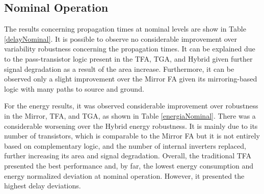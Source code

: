 \documentclass[pgmicro,mestrado,english]{iiufrgs}
\begin{document}
\subsection{Nominal Operation}

The results concerning propagation times at nominal levels are show in Table \ref{delayNominal}. It is possible to observe no considerable improvement over variability robustness concerning the propagation times. It can be explained due to the pass-transistor logic present in the TFA, TGA, and Hybrid given further signal degradation as a result of the area increase. Furthermore, it can be observed only a slight improvement over the Mirror FA given its mirroring-based logic with many paths to source and ground.

For the energy results, it was observed considerable improvement over robustness in the Mirror, TFA, and TGA, as shown in Table \ref{energiaNominal}. There was a considerable worsening over the Hybrid energy robustness. It is mainly due to its number of transistors, which is comparable to the Mirror FA but it is not entirely based on complementary logic, and the number of internal inverters replaced, further increasing its area and signal degradation. Overall, the traditional TFA presented the best performance and, by far, the lowest energy consumption and energy normalized deviation at nominal operation. However, it presented the highest delay deviations. 

\end{document}
